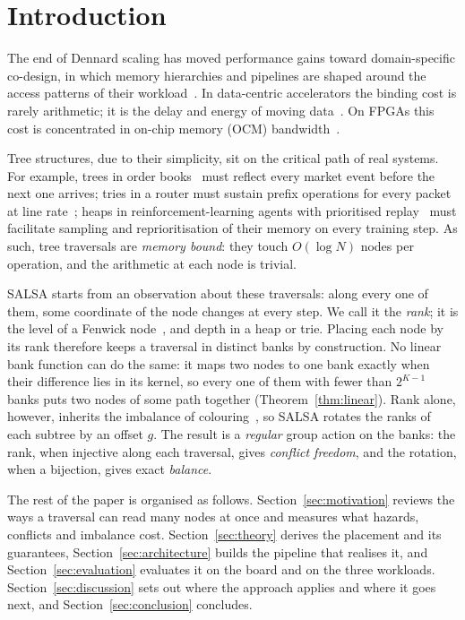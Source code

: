\section{Introduction}\label{sec:intro}

The end of Dennard scaling has moved performance gains toward domain-specific
co-design, in which memory hierarchies and pipelines are shaped around the
access patterns of their workload~\cite{hennessy2019new}.
In data-centric accelerators the binding cost is rarely arithmetic; it is the
delay and energy of moving data~\cite{PECCERILLO2022102561}. On FPGAs this cost
is concentrated in on-chip memory (OCM) bandwidth~\cite{fpganearmemory2021}.

Tree structures, due to their simplicity, sit on the
critical path of real systems. For example, trees in order
books~\cite{boutros2017build} must reflect every market event before
the next one arrives; tries in a router must sustain prefix
operations for every packet at line rate~\cite{jiang2026scamp};
heaps in reinforcement-learning agents with prioritised
replay~\cite{schaul2016per} must facilitate
sampling and reprioritisation of their memory on every training step.
As such, tree traversals are \emph{memory bound}: they touch $O(\log N)$ nodes
per operation, and the arithmetic at each node is trivial.

SALSA starts from an observation about these traversals: along every one of
them, some coordinate of the node changes at every step. We call it the
\emph{rank}; it is the level of a Fenwick node~\cite{fenwick1994},
and depth in a heap or trie. Placing each node by its rank therefore keeps a traversal in distinct
banks by construction. No linear bank function can do the same: it maps two
nodes to one bank exactly when their difference lies in its kernel,
so every one of them with fewer than $2^{K-1}$ banks puts two nodes of some
path together (Theorem~\ref{thm:linear}).
Rank alone, however, inherits the imbalance of
colouring~\cite{das2000mappings}, so SALSA rotates the
ranks of each subtree by an offset $g$. The result is a \emph{regular} group
action on the banks: the rank, when injective along each traversal, gives
\emph{conflict freedom}, and the rotation, when a bijection, gives exact
\emph{balance}.

The rest of the paper is organised as follows. Section~\ref{sec:motivation}
reviews the ways a traversal can read many nodes at once and measures what
hazards, conflicts and imbalance cost. Section~\ref{sec:theory} derives the
placement and its guarantees, Section~\ref{sec:architecture} builds the
pipeline that realises it, and Section~\ref{sec:evaluation} evaluates it on the
board and on the three workloads. Section~\ref{sec:discussion} sets out where
the approach applies and where it goes next, and Section~\ref{sec:conclusion}
concludes.
